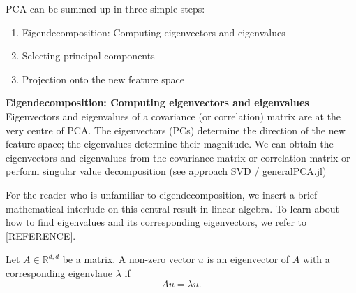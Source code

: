\documentclass[journal, a4paper]{IEEEtran}
\begin{document}


PCA can be summed up in three simple steps:
\begin{enumerate}
	\item Eigendecomposition: Computing eigenvectors and eigenvalues
	\item Selecting principal components
	\item Projection onto the new feature space
\end{enumerate}
%
\textbf{Eigendecomposition: Computing eigenvectors and eigenvalues}\\
Eigenvectors and eigenvalues of a covariance (or correlation) matrix are at the very centre of PCA. The eigenvectors (PCs) determine the direction of the new feature space; the eigenvalues determine their magnitude. 
We can obtain the eigenvectors and eigenvalues from the covariance matrix or correlation matrix or perform singular value decomposition (see approach SVD / generalPCA.jl)

For the reader who is unfamiliar to eigendecomposition, we insert a brief mathematical interlude on this central result in linear algebra. To learn about how to find eigenvalues and its corresponding eigenvectors, we refer to [REFERENCE].

Let \( A \in \mathbb{R}^{d,d}\) be a matrix. A non-zero vector \( u \) is an eigenvector of \( A \) with a corresponding eigenvlaue \( \lambda \) if 
\begin{equation}
	A u = \lambda u .
\end{equation}
\end{document}
